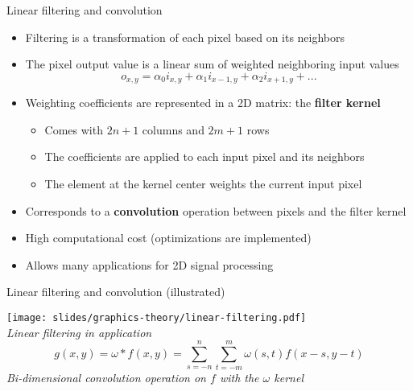 \begin{frame}{Linear filtering and convolution}
  \begin{itemize}
  \item Filtering is a transformation of each pixel based on its neighbors
  \item The pixel output value is a linear sum of weighted neighboring input values
\[
o_{x,y} = \alpha_0 i_{x,y} + \alpha_1 i_{x-1,y} + \alpha_2 i_{x+1,y} + ...
\]
  \item Weighting coefficients are represented in a 2D matrix: the \textbf{filter kernel}
    \begin{itemize}
    \item Comes with \(2n + 1\) columns and \(2m + 1\) rows
    \item The coefficients are applied to each input pixel and its neighbors
    \item The element at the kernel center weights the current input pixel
    \end{itemize}
  \item Corresponds to a \textbf{convolution} operation between pixels and the filter kernel
  \item High computational cost (optimizations are implemented)
  \item Allows many applications for 2D signal processing
  \end{itemize}
\end{frame}

\begin{frame}{Linear filtering and convolution (illustrated)}
  \begin{center}
  \texttt{[image: slides/graphics-theory/linear-filtering.pdf]}\\
  \textit{\small Linear filtering in application}
\[
g(x,y)= \omega *f(x,y)=\sum_{s=-n}^n{\sum_{t=-m}^m{ \omega (s,t)f(x-s,y-t)}}
\]
  \textit{\small Bi-dimensional convolution operation on \(f\) with the \(\omega\) kernel}
  \end{center}
\end{frame}

